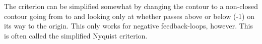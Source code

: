 The criterion can be simplified somewhat by changing the contour to a non-closed contour going from  to  and looking only at whether  passes above or below (-1) on its way to the origin. This only works for negative feedback-loops, however. This is often called the simplified Nyquist criterion. %














